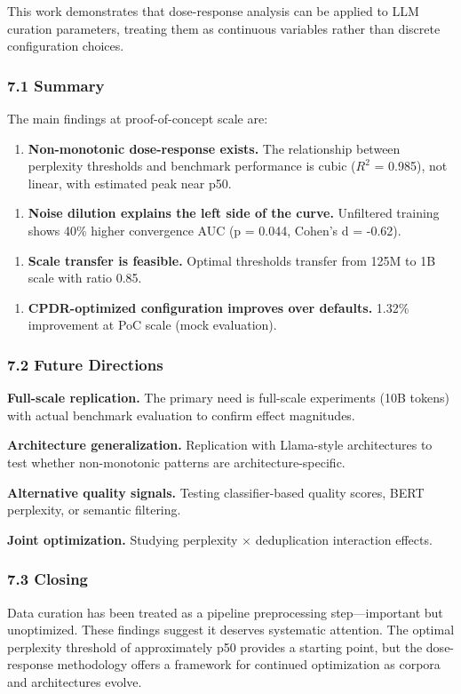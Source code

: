 
This work demonstrates that dose-response analysis can be applied to LLM curation parameters, treating them as continuous variables rather than discrete configuration choices.

\subsubsection{7.1 Summary}

The main findings at proof-of-concept scale are:

\begin{enumerate}
\item \textbf{Non-monotonic dose-response exists.} The relationship between perplexity thresholds and benchmark performance is cubic ($R^2$ = 0.985), not linear, with estimated peak near p50.
\end{enumerate}

\begin{enumerate}
\item \textbf{Noise dilution explains the left side of the curve.} Unfiltered training shows 40\% higher convergence AUC (p = 0.044, Cohen's d = -0.62).
\end{enumerate}

\begin{enumerate}
\item \textbf{Scale transfer is feasible.} Optimal thresholds transfer from 125M to 1B scale with ratio 0.85.
\end{enumerate}

\begin{enumerate}
\item \textbf{CPDR-optimized configuration improves over defaults.} 1.32\% improvement at PoC scale (mock evaluation).
\end{enumerate}

\subsubsection{7.2 Future Directions}

\textbf{Full-scale replication.} The primary need is full-scale experiments (10B tokens) with actual benchmark evaluation to confirm effect magnitudes.

\textbf{Architecture generalization.} Replication with Llama-style architectures to test whether non-monotonic patterns are architecture-specific.

\textbf{Alternative quality signals.} Testing classifier-based quality scores, BERT perplexity, or semantic filtering.

\textbf{Joint optimization.} Studying perplexity $\times$ deduplication interaction effects.

\subsubsection{7.3 Closing}

Data curation has been treated as a pipeline preprocessing step---important but unoptimized. These findings suggest it deserves systematic attention. The optimal perplexity threshold of approximately p50 provides a starting point, but the dose-response methodology offers a framework for continued optimization as corpora and architectures evolve.
